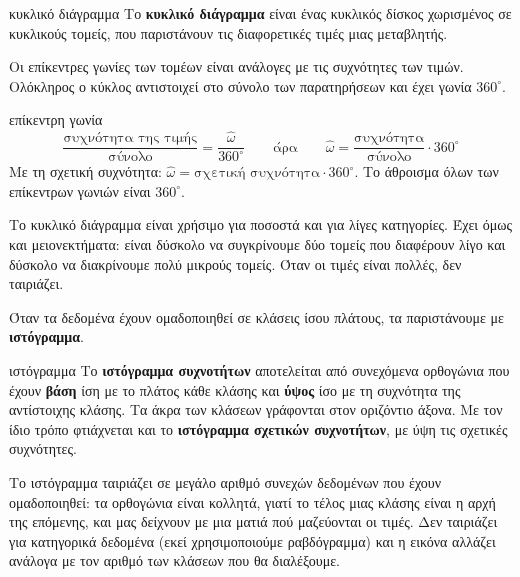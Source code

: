 
\begin{orismos}{κυκλικό διάγραμμα}
Το \textbf{κυκλικό διάγραμμα} είναι ένας κυκλικός δίσκος χωρισμένος σε κυκλικούς τομείς, που παριστάνουν τις διαφορετικές τιμές μιας μεταβλητής.
\end{orismos}

Οι επίκεντρες γωνίες των τομέων είναι ανάλογες με τις συχνότητες των τιμών. Ολόκληρος ο κύκλος αντιστοιχεί στο σύνολο των παρατηρήσεων και έχει γωνία $360^\circ$.

\begin{kanonas}{επίκεντρη γωνία}
$$\frac{\text{συχνότητα της τιμής}}{\text{σύνολο}}=\frac{\hat{\omega}}{360^\circ}\qquad\text{άρα}\qquad \hat{\omega}=\frac{\text{συχνότητα}}{\text{σύνολο}}\cdot 360^\circ$$
Με τη σχετική συχνότητα: $\hat{\omega}=\text{σχετική συχνότητα}\cdot360^\circ$. Το άθροισμα όλων των επίκεντρων γωνιών είναι $360^\circ$.
\end{kanonas}

Το κυκλικό διάγραμμα είναι χρήσιμο για ποσοστά και για λίγες κατηγορίες. Έχει όμως και μειονεκτήματα: είναι δύσκολο να συγκρίνουμε δύο τομείς που διαφέρουν λίγο και δύσκολο να διακρίνουμε πολύ μικρούς τομείς. Όταν οι τιμές είναι πολλές, δεν ταιριάζει.


Όταν τα δεδομένα έχουν ομαδοποιηθεί σε κλάσεις ίσου πλάτους, τα παριστάνουμε με \textbf{ιστόγραμμα}. 

\begin{orismos}{ιστόγραμμα}
Το \textbf{ιστόγραμμα συχνοτήτων} αποτελείται από συνεχόμενα ορθογώνια που έχουν \textbf{βάση} ίση με το πλάτος κάθε κλάσης και \textbf{ύψος} ίσο με τη συχνότητα της αντίστοιχης κλάσης. Τα άκρα των κλάσεων γράφονται στον οριζόντιο άξονα. Με τον ίδιο τρόπο φτιάχνεται και το \textbf{ιστόγραμμα σχετικών συχνοτήτων}, με ύψη τις σχετικές συχνότητες.
\end{orismos}

Το ιστόγραμμα ταιριάζει σε μεγάλο αριθμό συνεχών δεδομένων που έχουν ομαδοποιηθεί: τα ορθογώνια είναι κολλητά, γιατί το τέλος μιας κλάσης είναι η αρχή της επόμενης, και μας δείχνουν με μια ματιά πού μαζεύονται οι τιμές. Δεν ταιριάζει για κατηγορικά δεδομένα (εκεί χρησιμοποιούμε ραβδόγραμμα) και η εικόνα αλλάζει ανάλογα με τον αριθμό των κλάσεων που θα διαλέξουμε.

